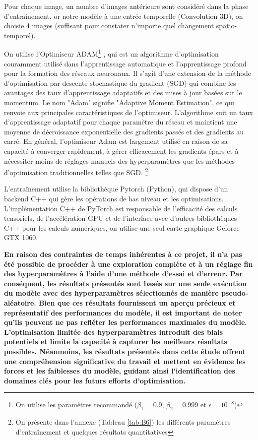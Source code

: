 Pour chaque image, un nombre d'images antérieure sont considéré dans la phase d'entraînement, or notre modèle à une entrée temporelle (Convolution 3D), on choisie 4 images (suffisant pour constater n'importe quel changement spatio-temporel).

On utilise l’Optimiseur ADAM\footnote{On utilise les paramètres recommandé ($\beta_1=0.9$, $\beta_2=0.999$ et $\epsilon = 10^{-8}$)} \cite{56}, qui est un algorithme d'optimisation couramment utilisé dans l'apprentissage automatique et l'apprentissage profond pour la formation des réseaux neuronaux. Il s'agit d'une extension de la méthode d'optimisation par descente stochastique du gradient (SGD) qui combine les avantages des taux d'apprentissage adaptatifs et des mises à jour basées sur le momentum.
Le nom "Adam" signifie "Adaptive Moment Estimation", ce qui renvoie aux principales caractéristiques de l'optimiseur. L'algorithme suit un taux d'apprentissage adaptatif pour chaque paramètre du réseau et maintient une moyenne de décroissance exponentielle des gradients passés et des gradients au carré. En général, l'optimiseur Adam est largement utilisé en raison de sa capacité à converger rapidement, à gérer efficacement les gradients épars et à nécessiter moins de réglages manuels des hyperparamètres que les méthodes d'optimisation traditionnelles telles que SGD. \footnote{On présente dans l'annexe (Tableau \ref{tab:B6}) les différents paramètres d'entraînement et quelques résultats quantitatives}

L'entraînement utilise la bibliothèque Pytorch (Python), qui dispose d'un backend C++ qui gère les opérations de bas niveau et les optimisations. L'implémentation C++ de PyTorch est responsable de l'efficacité des calculs tensoriels, de l'accélération GPU et de l'interface avec d'autres bibliothèques C++ pour les calculs numériques, on utilise une seul carte graphique Geforce GTX 1060.

\textbf{En raison des contraintes de temps inhérentes à ce projet, il n'a pas été possible de procéder à une exploration complète et à un réglage fin des hyperparamètres à l'aide d'une méthode d'essai et d'erreur. Par conséquent, les résultats présentés sont basés sur une seule exécution du modèle avec des hyperparamètres sélectionnés de manière pseudo-aléatoire. Bien que ces résultats fournissent un aperçu précieux et représentatif des performances du modèle, il est important de noter qu'ils peuvent ne pas refléter les performances maximales du modèle. L'optimisation limitée des hyperparamètres introduit des biais potentiels et limite la capacité à capturer les meilleurs résultats possibles. Néanmoins, les résultats présentés dans cette étude offrent une compréhension significative du travail et mettent en évidence les forces et les faiblesses du modèle, guidant ainsi l'identification des domaines clés pour les futurs efforts d'optimisation.}
